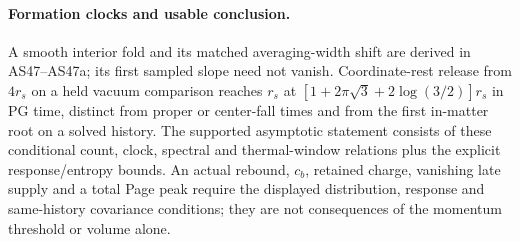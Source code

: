 \documentclass[10pt]{article}
\begin{document}
\paragraph{Formation clocks and usable conclusion.}
A smooth interior fold and its matched averaging-width
shift are derived in AS47--AS47a; its first sampled
slope need not vanish. Coordinate-rest release from
\(4r_s\) on a held vacuum comparison reaches \(r_s\)
at \([1+2\pi\sqrt3+2\log(3/2)]r_s\) in PG time,
distinct from proper or center-fall times and from
the first in-matter root on a solved history.
The supported asymptotic statement consists of these
conditional count, clock, spectral and thermal-window
relations plus the explicit response/entropy bounds.
An actual rebound, \(c_b\), retained charge,
vanishing late supply and a total Page peak require
the displayed distribution, response and same-history
covariance conditions; they are not consequences of
the momentum threshold or volume alone.
\end{document}
